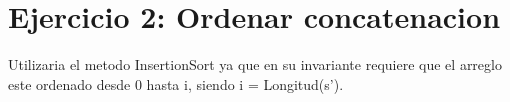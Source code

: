 \section{Ejercicio 2: Ordenar concatenacion}
Utilizaria el metodo InsertionSort ya que en su invariante requiere que el arreglo este ordenado desde 0 hasta i, siendo i = Longitud(s').